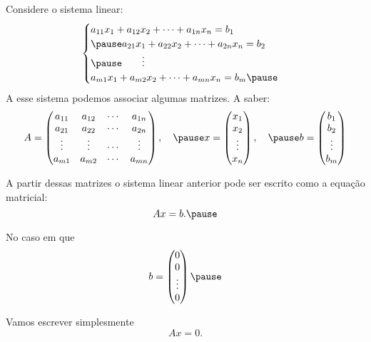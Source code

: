 \documentclass{beamer}
\begin{document}
    \begin{frame}
        Considere o sistema linear: \pause
        \begin{equation}
            \begin{cases}
                a_{11}x_1 + a_{12}x_2 + \cdots + a_{1n}x_n = b_1\\\pause
                a_{21}x_1 + a_{22}x_2 + \cdots + a_{2n}x_n = b_2\\\pause
                \qquad \vdots\\
                a_{m1}x_1 + a_{m2}x_2 + \cdots + a_{mn}x_n = b_m\pause
            \end{cases}
        \end{equation}
        A esse sistema podemos associar algumas matrizes. \pause A saber:
        \[
            A = \begin{pmatrix}
                a_{11} & a_{12} & \cdots & a_{1n}\\
                a_{21} & a_{22} & \cdots & a_{2n}\\
                \vdots & \vdots & \cdots & \vdots\\
                a_{m1} & a_{m2} & \cdots & a_{mn}
            \end{pmatrix}, \quad\pause
            x = \begin{pmatrix}
                x_1\\
                x_2\\
                \vdots\\
                x_n
            \end{pmatrix},\quad \pause
            b = \begin{pmatrix}
                b_1\\
                b_2\\
                \vdots\\
                b_m
            \end{pmatrix}
        \]
    \end{frame}

    \begin{frame}
        A partir dessas matrizes o sistema linear anterior pode ser escrito como a equação matricial:\pause
        \[
            Ax = b.\pause
        \]

        No caso em que
        \[
            b = \begin{pmatrix}
                0\\0\\\vdots\\0
            \end{pmatrix}\pause
        \]

        Vamos escrever simplesmente
        \[
            Ax = 0.
        \]
    \end{frame}
\end{document}

